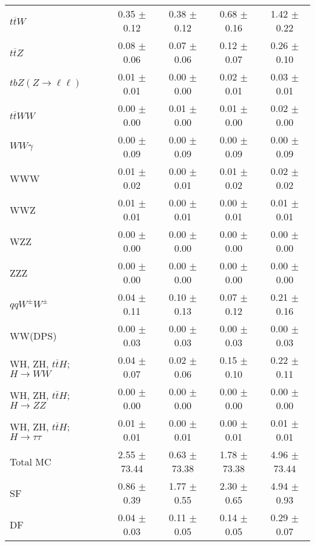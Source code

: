 \begin{tabular}{l|cccc}
                   $t\overline{t}W$ &  0.35 $\pm$  0.12 &  0.38 $\pm$  0.12 &  0.68 $\pm$  0.16 &  1.42 $\pm$  0.22 \\
                   $t\overline{t}Z$ &  0.08 $\pm$  0.06 &  0.07 $\pm$  0.06 &  0.12 $\pm$  0.07 &  0.26 $\pm$  0.10 \\
    $tbZ (Z \rightarrow \ell \ell)$ &  0.01 $\pm$  0.01 &  0.00 $\pm$  0.00 &  0.02 $\pm$  0.01 &  0.03 $\pm$  0.01 \\
                  $t\overline{t}WW$ &  0.00 $\pm$  0.00 &  0.01 $\pm$  0.00 &  0.01 $\pm$  0.00 &  0.02 $\pm$  0.00 \\
                         $WW\gamma$ &  0.00 $\pm$  0.09 &  0.00 $\pm$  0.09 &  0.00 $\pm$  0.09 &  0.00 $\pm$  0.09 \\
                                WWW &  0.01 $\pm$  0.02 &  0.00 $\pm$  0.01 &  0.01 $\pm$  0.02 &  0.02 $\pm$  0.02 \\
                                WWZ &  0.01 $\pm$  0.01 &  0.00 $\pm$  0.01 &  0.00 $\pm$  0.01 &  0.01 $\pm$  0.01 \\
                                WZZ &  0.00 $\pm$  0.00 &  0.00 $\pm$  0.00 &  0.00 $\pm$  0.00 &  0.00 $\pm$  0.00 \\
                                ZZZ &  0.00 $\pm$  0.00 &  0.00 $\pm$  0.00 &  0.00 $\pm$  0.00 &  0.00 $\pm$  0.00 \\
                 $qqW^{\pm}W^{\pm}$ &  0.04 $\pm$  0.11 &  0.10 $\pm$  0.13 &  0.07 $\pm$  0.12 &  0.21 $\pm$  0.16 \\
                            WW(DPS) &  0.00 $\pm$  0.03 &  0.00 $\pm$  0.03 &  0.00 $\pm$  0.03 &  0.00 $\pm$  0.03 \\
WH, ZH, $t\bar{t}H$; $H \rightarrow WW$ &  0.04 $\pm$  0.07 &  0.02 $\pm$  0.06 &  0.15 $\pm$  0.10 &  0.22 $\pm$  0.11 \\
WH, ZH, $t\bar{t}H$; $H \rightarrow ZZ$ &  0.00 $\pm$  0.00 &  0.00 $\pm$  0.00 &  0.00 $\pm$  0.00 &  0.00 $\pm$  0.00 \\
WH, ZH, $t\bar{t}H$; $H \rightarrow \tau\tau$ &  0.01 $\pm$  0.01 &  0.00 $\pm$  0.01 &  0.00 $\pm$  0.01 &  0.01 $\pm$  0.01 \\
\hline\hline
                           Total MC &  2.55 $\pm$ 73.44 &  0.63 $\pm$ 73.38 &  1.78 $\pm$ 73.38 &  4.96 $\pm$ 73.44 \\
\hline
                                 SF &  0.86 $\pm$  0.39 &  1.77 $\pm$  0.55 &  2.30 $\pm$  0.65 &  4.94 $\pm$  0.93 \\
                                 DF &  0.04 $\pm$  0.03 &  0.11 $\pm$  0.05 &  0.14 $\pm$  0.05 &  0.29 $\pm$  0.07 \\

\end{tabular}
